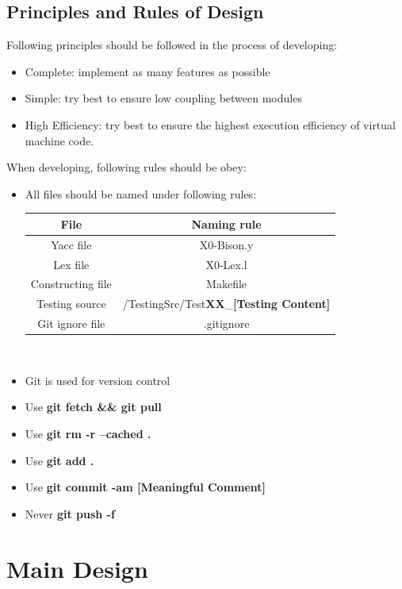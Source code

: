 \documentclass{article}
\begin{document}
		\subsection{Principles and Rules of Design}
		Following principles should be followed in the process of developing:
		\begin{itemize}
		\item Complete: implement as many features as possible
		\item Simple: try best to ensure low coupling between modules
		\item High Efficiency: try best to ensure the highest execution efficiency of virtual machine code.
		\end{itemize}
		When developing, following rules should be obey:
		\begin{itemize}
		\item All files should be named under following rules:
		\begin{center}
		\begin{tabular}{cc}
			\toprule
			File & Naming rule\\
			\midrule
			Yacc file & X0-Bison.y\\
			Lex file & X0-Lex.l\\
			Constructing file & Makefile\\
			Testing source & /TestingSrc/Test\textbf{XX}\_\textbf{[Testing Content]} \\
			Git ignore file & .gitignore \\
			\bottomrule 
		\end{tabular}\\
		\end{center}
		\item Git is used for version control
		\item Use \textbf{git fetch \&\& git pull}
		\item Use \textbf{git rm -r --cached .}
		\item Use \textbf{git add .}
		\item Use \textbf{git commit -am [Meaningful Comment]}
		\item Never \textbf{git push -f}
		\end{itemize}
		\section{Main Design}
\end{document}
